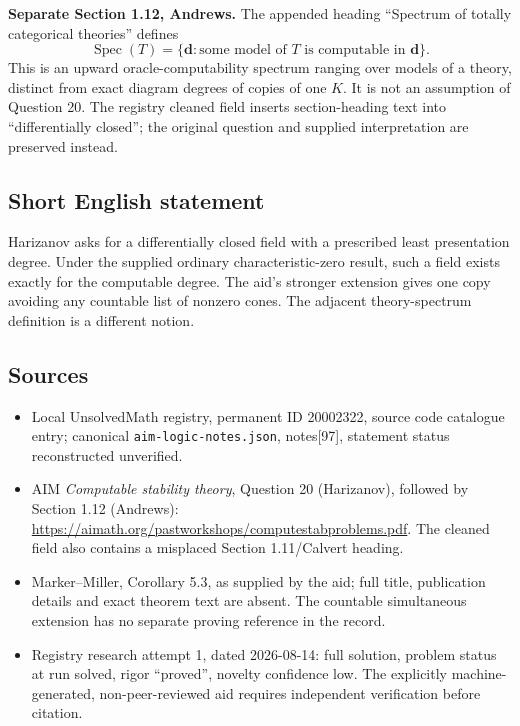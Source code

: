 \documentclass[11pt]{article}
\begin{document}
\textbf{Separate Section 1.12, Andrews.} The appended heading ``Spectrum of totally categorical theories'' defines
\[
 \operatorname{Spec}(T)=\{\mathbf d:\text{some model of }T
                                      \text{ is computable in }\mathbf d\}.
\]
This is an upward oracle-computability spectrum ranging over models of a theory, distinct from exact diagram degrees of copies of one $K$. It is not an assumption of Question 20. The registry cleaned field inserts section-heading text into ``differentially closed''; the original question and supplied interpretation are preserved instead.
\subsection{Short English statement}
Harizanov asks for a differentially closed field with a prescribed least presentation degree. Under the supplied ordinary characteristic-zero result, such a field exists exactly for the computable degree. The aid's stronger extension gives one copy avoiding any countable list of nonzero cones. The adjacent theory-spectrum definition is a different notion.
\subsection{Sources}
\begin{itemize}
\item Local UnsolvedMath registry, permanent ID 20002322, source code catalogue entry; canonical \texttt{aim-logic-notes.json}, notes[97], statement status reconstructed unverified.
\item AIM \emph{Computable stability theory}, Question 20 (Harizanov), followed by Section 1.12 (Andrews): \url{https://aimath.org/pastworkshops/computestabproblems.pdf}. The cleaned field also contains a misplaced Section 1.11/Calvert heading.
\item Marker--Miller, Corollary 5.3, as supplied by the aid; full title, publication details and exact theorem text are absent. The countable simultaneous extension has no separate proving reference in the record.
\item Registry research attempt 1, dated 2026-08-14: full solution, problem status at run solved, rigor ``proved'', novelty confidence low. The explicitly machine-generated, non-peer-reviewed aid requires independent verification before citation.
\end{itemize}
\end{document}
